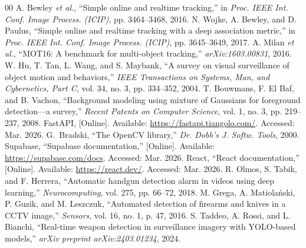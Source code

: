 \documentclass[conference]{IEEEtran}
\begin{document}
\begin{thebibliography}{00}
A. Bewley \textit{et al.}, ``Simple online and realtime tracking,'' in \textit{Proc. IEEE Int. Conf. Image Process. (ICIP)}, pp. 3464--3468, 2016.
N. Wojke, A. Bewley, and D. Paulus, ``Simple online and realtime tracking with a deep association metric,'' in \textit{Proc. IEEE Int. Conf. Image Process. (ICIP)}, pp. 3645--3649, 2017.
A. Milan \textit{et al.}, ``MOT16: A benchmark for multi-object tracking,'' \textit{arXiv:1603.00831}, 2016.
W. Hu, T. Tan, L. Wang, and S. Maybank, ``A survey on visual surveillance of object motion and behaviors,'' \textit{IEEE Transactions on Systems, Man, and Cybernetics, Part C}, vol. 34, no. 3, pp. 334--352, 2004.
T. Bouwmans, F. El Baf, and B. Vachon, ``Background modeling using mixture of Gaussians for foreground detection---a survey,'' \textit{Recent Patents on Computer Science}, vol. 1, no. 3, pp. 219--237, 2008.
FastAPI, [Online]. Available: \url{https://fastapi.tiangolo.com/}. Accessed: Mar. 2026.
G.~Bradski, ``The OpenCV library,'' \textit{Dr. Dobb's J. Softw. Tools}, 2000.
Supabase, ``Supabase documentation,'' [Online]. Available: \url{https://supabase.com/docs}. Accessed: Mar. 2026.
React, ``React documentation,'' [Online]. Available: \url{https://react.dev/}. Accessed: Mar. 2026.
R. Olmos, S. Tabik, and F. Herrera, ``Automatic handgun detection alarm in videos using deep learning,'' \textit{Neurocomputing}, vol. 275, pp. 66--72, 2018.
M. Grega, A. Matiola\'nski, P. Guzik, and M. Leszczuk, ``Automated detection of firearms and knives in a CCTV image,'' \textit{Sensors}, vol. 16, no. 1, p. 47, 2016.
S. Taddeo, A. Rossi, and L. Bianchi, ``Real-time weapon detection in surveillance imagery with YOLO-based models,'' \textit{arXiv preprint arXiv:2403.01234}, 2024.
\end{thebibliography}
\end{document}
